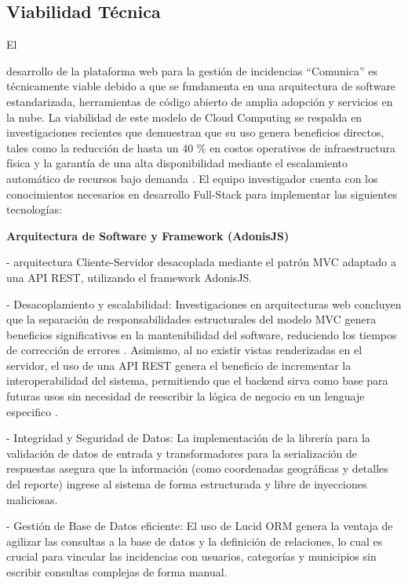 \subsection{Viabilidad Técnica}
\label{subsec:tecnica}
 \hypertarget{subsec:viabiTec}{El} desarrollo de la plataforma web para la gestión de incidencias “Comunica” es técnicamente viable debido a que se fundamenta en una arquitectura de software estandarizada, herramientas de código abierto de amplia adopción y servicios en la nube. La viabilidad de este modelo de Cloud Computing se respalda en investigaciones recientes que demuestran que su uso genera beneficios directos, tales como la reducción de hasta un 40 \% en costos operativos de infraestructura física y la garantía de una alta disponibilidad mediante el escalamiento automático de recursos bajo demanda  \parencite{perez2023cloud}. El equipo investigador cuenta con los conocimientos necesarios en desarrollo Full-Stack para implementar las siguientes tecnologías:
 
 \vspace{0.3cm}
 \textbf{Arquitectura de Software y Framework (AdonisJS)}
 
- arquitectura Cliente-Servidor desacoplada mediante el patrón MVC adaptado a una API REST, utilizando el framework AdonisJS.
 
 - Desacoplamiento y escalabilidad: Investigaciones en arquitecturas web concluyen que la separación de responsabilidades estructurales del modelo MVC genera beneficios significativos en la mantenibilidad del software, reduciendo los tiempos de corrección de errores \parencite{lopez2022mvc}. Asimismo, al no existir vistas renderizadas en el servidor, el uso de una API REST genera el beneficio de incrementar la interoperabilidad del sistema, permitiendo que el backend sirva como base para futuras usos sin necesidad de reescribir  la lógica de negocio en un lenguaje especifico \parencite{martinez2023rest}.
 
 - Integridad y Seguridad de Datos: La implementación de la librería \cite{vinejs2024} para la validación de datos de entrada y transformadores para la serialización de respuestas asegura que la información (como coordenadas geográficas y detalles del reporte) ingrese al sistema de forma estructurada y libre de inyecciones maliciosas.
 
 -  Gestión de Base de Datos eficiente: El uso de Lucid ORM \cite{adonisjs2024} genera la ventaja de agilizar las consultas a la base de datos y la definición de relaciones, lo cual es crucial para vincular las incidencias con usuarios, categorías y municipios sin escribir consultas complejas de forma manual.
 
